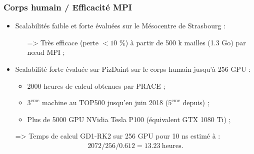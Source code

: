\begin{frame}
\frametitle{Corps humain / Efficacité MPI}
\vfill
\begin{itemize}
\item Scalabilités faible et forte évaluées sur le Mésocentre de Strasbourg :
\begin{itemize}
\item [=>] Très efficace (perte $< 10$ \%) à partir de 500 k mailles (1.3 Go) par nœud MPI ;
\end{itemize}
\vfill
\item Scalabilité forte évaluée sur PizDaint sur le corps humain jusqu'à 256 GPU :
\begin{itemize}
\item 2000 heures de calcul obtenues par PRACE ;
\item $3^{\mathrm{eme}}$ machine au TOP500 jusqu'en juin 2018 ($5^{\mathrm{eme}}$ depuis) ;
\item Plus de 5000 GPU NVidia Tesla P100 (équivalent GTX 1080 Ti) ;
\end{itemize}
\end{itemize}
\vfill
{}
\begin{itemize}
\item [=>] Temps de calcul GD1-RK2 sur 256 GPU pour 10 ns estimé à :
\begin{align*}
2072 / 256 / 0.612 = 13.23 \ \mathrm{heures.}
\end{align*}
\end{itemize}
\vfill
\end{frame}

